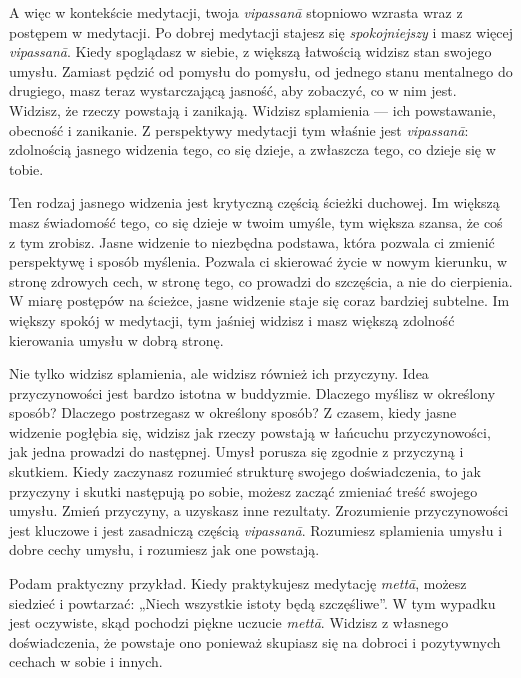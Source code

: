\documentclass[12pt,openany]{book}
\begin{document}
A więc w kontekście medytacji, twoja \textit{vipassanā} stopniowo \linebreak wzrasta wraz z postępem w medytacji. Po dobrej medytacji stajesz się \textit{spokojniejszy} i masz więcej \textit{vipassanā}. Kiedy spoglądasz w siebie, z większą łatwością widzisz stan swojego umysłu. Zamiast pędzić od pomysłu do pomysłu, od jednego stanu mentalnego do drugiego, masz teraz wystarczającą jasność, aby zobaczyć, co w nim jest. Widzisz, że rzeczy powstają i zanikają. Widzisz splamienia --- ich powstawanie, obecność i zanikanie. Z perspektywy medytacji tym właśnie jest \textit{vipassanā}: zdolnością jasnego widzenia tego, co się dzieje, a zwłaszcza tego, co dzieje się w tobie.

Ten rodzaj jasnego widzenia jest krytyczną częścią ścieżki duchowej. Im większą masz świadomość tego, co się dzieje w twoim umyśle, tym większa szansa, że coś z tym zrobisz. Jasne widzenie to niezbędna podstawa, która pozwala ci zmienić perspektywę i sposób myślenia. Pozwala ci skierować życie w nowym kierunku, w stronę zdrowych cech, w stronę tego, co prowadzi do szczęścia, a nie do cierpienia. W miarę postępów na ścieżce, jasne widzenie staje się coraz bardziej subtelne. Im większy spokój w medytacji, tym jaśniej widzisz i masz większą zdolność kierowania umysłu w dobrą stronę.

Nie tylko widzisz splamienia, ale widzisz również ich przyczyny. Idea przyczynowości jest bardzo istotna w buddyzmie. \linebreak Dlaczego myślisz w określony sposób? Dlaczego postrzegasz w określony sposób? Z czasem, kiedy jasne widzenie pogłębia się, widzisz jak rzeczy powstają w łańcuchu przyczynowości, jak \linebreak jedna prowadzi do następnej. Umysł porusza się zgodnie z przyczyną i skutkiem. Kiedy zaczynasz rozumieć strukturę swojego doświadczenia, to jak przyczyny i skutki następują po sobie, możesz zacząć zmieniać treść swojego umysłu. Zmień przyczyny, a uzyskasz inne rezultaty. Zrozumienie przyczynowości jest klu\-czo\-we i jest zasadniczą częścią \textit{vipassanā}. Rozumiesz splamienia umysłu i dobre cechy umysłu, i rozumiesz jak one powstają.

Podam praktyczny przykład. Kiedy praktykujesz medytację \textit{mettā}, możesz siedzieć i powtarzać: „Niech wszystkie istoty będą szczęśliwe”. W tym wypadku jest oczywiste, skąd pochodzi piękne uczucie \textit{mettā}. Widzisz z własnego doświadczenia, że powstaje ono ponieważ skupiasz się na dobroci i pozytywnych cechach w sobie i innych.
\end{document}
